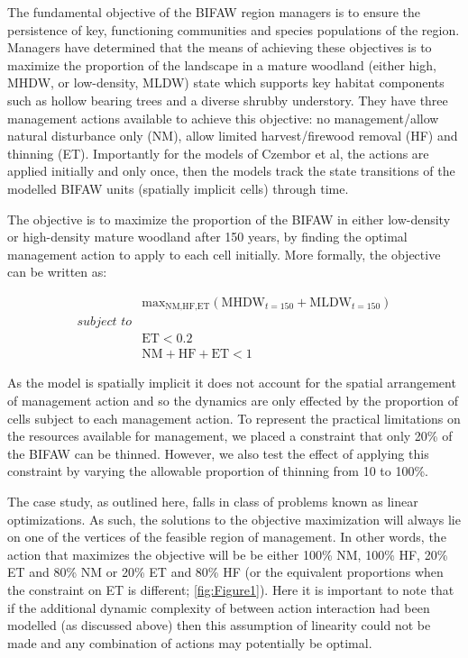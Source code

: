 \documentclass[draft]{article}
\theoremstyle{definition}
\theoremstyle{definition}
\theoremstyle{definition}
\theoremstyle{remark}
\begin{document}
The fundamental objective of the BIFAW region managers is to ensure the
persistence of key, functioning communities and species populations of
the region. Managers have determined that the means of achieving these
objectives is to maximize the proportion of the landscape in a mature
woodland (either high, MHDW, or low-density, MLDW) state which supports
key habitat components such as hollow bearing trees and a diverse
shrubby understory. They have three management actions available to
achieve this objective: no management/allow natural disturbance only
(NM), allow limited harvest/firewood removal (HF) and thinning (ET).
Importantly for the models of Czembor et al, the actions are applied
initially and only once, then the models track the state transitions of
the modelled BIFAW units (spatially implicit cells) through time.

The objective is to maximize the proportion of the BIFAW in either
low-density or high-density mature woodland after 150 years, by finding
the optimal management action to apply to each cell initially. More
formally, the objective can be written as:

\begin{equation}
\begin{aligned}
&\textrm{max}_\textrm{NM,HF,ET}(\textrm{MHDW}_{t = 150} + \textrm{MLDW}_{t = 150})\\
\textit{subject to}&\\
&\textrm{ET} < 0.2\\
&\textrm{NM} + \textrm{HF} + \textrm{ET} < 1 
\end{aligned}
\label{eq:obj}
\end{equation}

As the model is spatially implicit it does not account for the spatial
arrangement of management action and so the dynamics are only effected
by the proportion of cells subject to each management action. To
represent the practical limitations on the resources available for
management, we placed a constraint that only 20\% of the BIFAW can be
thinned. However, we also test the effect of applying this constraint by
varying the allowable proportion of thinning from 10 to 100\%.

The case study, as outlined here, falls in class of problems known as
linear optimizations. As such, the solutions to the objective
maximization will always lie on one of the vertices of the feasible
region of management. In other words, the action that maximizes the
objective will be be either 100\% NM, 100\% HF, 20\% ET and 80\% NM or
20\% ET and 80\% HF (or the equivalent proportions when the constraint
on ET is different; \ref{fig:Figure1}). Here it is important to note
that if the additional dynamic complexity of between action interaction
had been modelled (as discussed above) then this assumption of linearity
could not be made and any combination of actions may potentially be
optimal.
\end{document}
